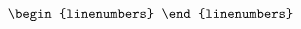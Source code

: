 \documentclass[10pt]{article}
\begin{document}
\[\begin{linenumbers}
%
%
%
%
%
%

\end{linenumbers}\]
\end{document}

